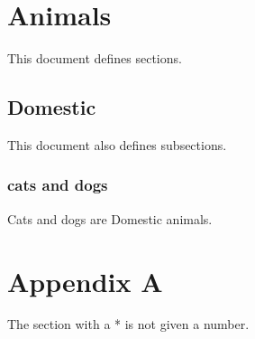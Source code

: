 \documentclass{article}
\begin{document}
\tableofcontents
\section{Animals}
This document defines sections.
\subsection{Domestic}
This document also defines subsections.
\subsubsection{cats and dogs}
Cats and dogs are Domestic animals.
\section*{Appendix A}
The section with a * is not given a number.
\end{document}
